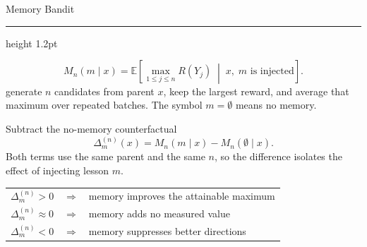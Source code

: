 \documentclass[aspectratio=169]{beamer}
\newcommand{\titlerule}{{\color{titledred}\hrule height 1.2pt}}
\begin{document}
\begin{frame}{Memory Bandit}
\vspace{0.3em}
\titlerule

\begin{block}{}
\[
M_n(m\mid x)=
\mathbb{E}\!\left[
\max_{1\le j\le n}R(Y_j)
\;\middle|\;x,\;m\text{ is injected}
\right].
\]
generate $n$ candidates from parent $x$, keep the
largest reward, and average that maximum over repeated batches. The symbol
$m=\emptyset$ means no memory.
\end{block}

\begin{block}{Subtract the no-memory counterfactual}
\[
\Delta_m^{(n)}(x)=M_n(m\mid x)-M_n(\emptyset\mid x).
\]
Both terms use the same parent and the same $n$, so the difference isolates the
effect of injecting lesson $m$.
\end{block}

\footnotesize{
\begin{center}
\begin{tabular}{ccl}
$\Delta_m^{(n)}>0$ & $\Rightarrow$ & memory improves the attainable maximum \\
$\Delta_m^{(n)}\approx0$ & $\Rightarrow$ & memory adds no measured value \\
$\Delta_m^{(n)}<0$ & $\Rightarrow$ & memory suppresses better directions
\end{tabular}
\end{center}
}
\end{frame}
\end{document}
